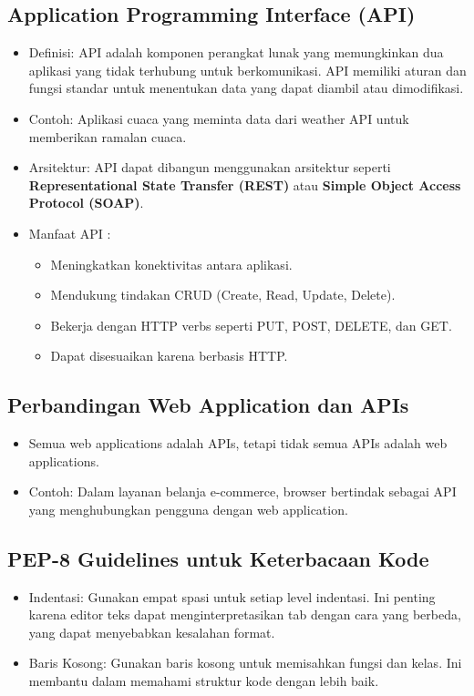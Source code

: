 \documentclass{article}
\begin{document}
\subsection{Application Programming Interface (API)}
\begin{itemize}
    \item Definisi: API adalah komponen perangkat lunak yang memungkinkan dua aplikasi yang tidak terhubung untuk berkomunikasi. API memiliki aturan dan fungsi standar untuk menentukan data yang dapat diambil atau dimodifikasi.
    \item Contoh: Aplikasi cuaca yang meminta data dari weather API untuk memberikan ramalan cuaca.
    \item Arsitektur: API dapat dibangun menggunakan arsitektur seperti \textbf{Representational State Transfer (REST)} atau \textbf{Simple Object Access Protocol (SOAP)}.
    \item Manfaat API :
          \begin{itemize}
              \item Meningkatkan konektivitas antara aplikasi.
              \item Mendukung tindakan CRUD (Create, Read, Update, Delete).
              \item Bekerja dengan HTTP verbs seperti PUT, POST, DELETE, dan GET.
              \item Dapat disesuaikan karena berbasis HTTP.
          \end{itemize}
\end{itemize}

\subsection{Perbandingan Web Application dan APIs}
\begin{itemize}
    \item Semua web applications adalah APIs, tetapi tidak semua APIs adalah web applications.
    \item Contoh: Dalam layanan belanja e-commerce, browser bertindak sebagai API yang menghubungkan pengguna dengan web application.
\end{itemize}

\subsection{PEP-8 Guidelines untuk Keterbacaan Kode}
\begin{itemize}
    \item Indentasi: Gunakan empat spasi untuk setiap level indentasi. Ini penting karena editor teks dapat menginterpretasikan tab dengan cara yang berbeda, yang dapat menyebabkan kesalahan format.
    \item Baris Kosong: Gunakan baris kosong untuk memisahkan fungsi dan kelas. Ini membantu dalam memahami struktur kode dengan lebih baik.
\end{itemize}
\end{document}
